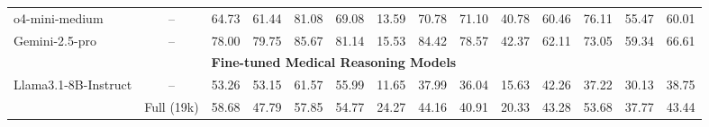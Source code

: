 \documentclass[letterpaper]{article} %
\newcommand{\tableLineColorGray}{\rowcolor{verylightgray}}
\begin{document}
\begin{table}[!t]
\begin{adjustbox}{max width=1.0\textwidth}
\begin{tabular}{llcccccccccccc}
o4-mini-medium                                      & \multicolumn{1}{c}{--}                             & 64.73                             & 61.44                             & 81.08                             & 69.08                                & 13.59                            & 70.78                             & 71.10                             & 40.78                             & 60.46                             & 76.11                             & 55.47                                & 60.01                                \\
Gemini-2.5-pro                                      & \multicolumn{1}{c}{--}                             & 78.00                             & 79.75                             & 85.67                             & 81.14                                & 15.53                            & 84.42                             & 78.57                             & 42.37                             & 62.11                             & 73.05                             & 59.34                                & 66.61                                \\ \midrule
\multicolumn{13}{c}{\textbf{Fine-tuned Medical Reasoning Models}}                                                                                                                                                                                                                                                                                                                                                                                                                                                         &                                      \\ \midrule
Llama3.1-8B-Instruct                                & \multicolumn{1}{c}{--}                             & 53.26                             & 53.15                             & 61.57                             & 55.99                                & 11.65                            & 37.99                             & 36.04                             & 15.63                             & 42.26                             & 37.22                             & 30.13                                & 38.75                                \\ \midrule
\tableLineColorGray \cellcolor{white}               & Full (19k)                                         & 58.68                             & 47.79                             & 57.85                             & 54.77                                & 24.27                            & 44.16                             & 40.91                             & 20.33                             & 43.28                             & 53.68                             & 37.77                                & 43.44                                \\ \cmidrule(l){2-14}

\end{tabular}
\end{adjustbox}
\end{table}
\end{document}
